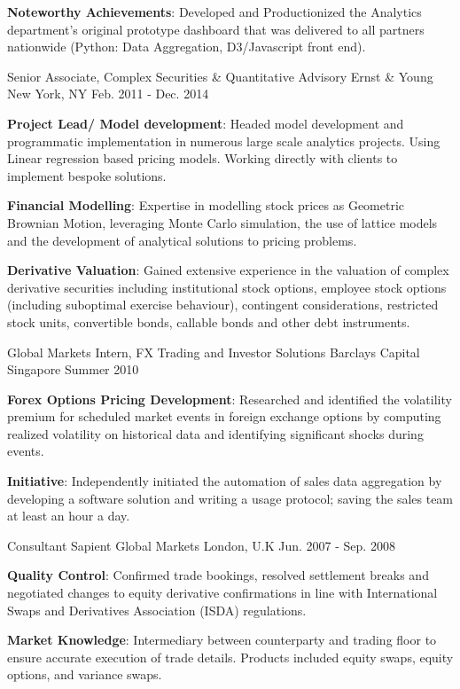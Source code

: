 \begin{cventries}
{\begin{cvitems}
{          }
          \item {\textbf{Noteworthy Achievements}: Developed and Productionized the Analytics department's original prototype dashboard that was delivered to all partners nationwide (Python: Data Aggregation, D3/Javascript front end).
          }
      \end{cvitems}
    }
  \cventry
    {Senior Associate, Complex Securities \& Quantitative Advisory}
    {Ernst \& Young}
    {New York, NY}
    {Feb. 2011 - Dec. 2014}
    {
      \begin{cvitems}
        \item {\textbf{Project Lead/ Model development}: Headed model development and programmatic implementation in numerous large scale analytics projects. Using Linear regression based pricing models. Working directly with clients to implement bespoke solutions.}
        \item {\textbf{Financial Modelling}: Expertise in modelling stock prices as Geometric Brownian Motion, leveraging Monte Carlo simulation, the use of lattice models and the development of analytical solutions to pricing problems.}
        \item {\textbf{Derivative Valuation}: Gained extensive experience in the valuation of complex derivative securities including institutional stock options, employee stock options (including suboptimal exercise behaviour), contingent considerations, restricted stock units, convertible bonds, callable bonds and other debt instruments.}
      \end{cvitems}
    }
  \cventry
    {Global Markets Intern, FX Trading and Investor Solutions}
    {Barclays Capital}
    {Singapore}
    {Summer 2010}
    {
      \begin{cvitems}
        \item {\textbf{Forex Options Pricing Development}: Researched and identified the volatility premium for scheduled  
        market events in foreign exchange options by computing realized volatility on historical data and   
        identifying significant shocks during events}.
        \item {\textbf{Initiative}: Independently initiated the automation of sales data aggregation by developing a software solution and writing a usage protocol; saving the sales team at least an hour a 
        day}.
      \end{cvitems} 
    }
  \cventry
    {Consultant}
    {Sapient Global Markets}
    {London, U.K}
    {Jun. 2007 - Sep. 2008}
    {
      \begin{cvitems}
        \item {\textbf{Quality Control}: Confirmed trade bookings, resolved settlement breaks and negotiated 
        changes to equity derivative confirmations in line with International Swaps and Derivatives Association 
        (ISDA) regulations}.
        \item {\textbf{Market Knowledge}: Intermediary between counterparty and trading floor to ensure accurate execution of trade details. Products included equity swaps, equity options, and variance swaps}.
      \end{cvitems}
    }
\end{cventries}
